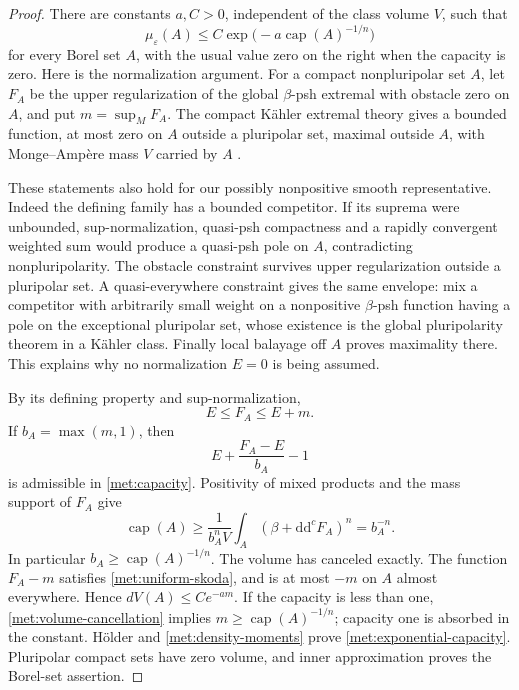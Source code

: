 \documentclass[11pt,letterpaper]{article}
\theoremstyle{definition}
\theoremstyle{remark}
\begin{document}
\begin{proof}
There are constants \(a,C>0\), independent of the class volume \(V\),
such that
\begin{equation}
 \label{met:exponential-capacity}
 \mu_\varepsilon(A)
 \leq C\exp\bigl(-a\operatorname{cap}(A)^{-1/n}\bigr)
\end{equation}
for every Borel set \(A\), with the usual value zero on the right when
the capacity is zero.  Here is the normalization argument.  For a
compact nonpluripolar set \(A\), let \(F_A\) be the upper regularization
of the global \(\beta\)-psh extremal with obstacle zero on \(A\), and
put \(m=\sup_M F_A\).  The compact K\"ahler extremal theory gives a
bounded function, at most zero on \(A\) outside a pluripolar set,
maximal outside \(A\), with Monge--Amp\`ere mass \(V\) carried by \(A\)
\cite[Sections 5--7]{GuedjZeriahiCapacity}.

These statements also hold for our possibly nonpositive smooth
representative.  Indeed the defining family has a bounded competitor.
If its suprema were unbounded, sup-normalization, quasi-psh compactness
and a rapidly convergent weighted sum would produce a quasi-psh pole
on \(A\), contradicting nonpluripolarity.  The obstacle constraint
survives upper regularization outside a pluripolar set.  A
quasi-everywhere constraint gives the same envelope: mix a competitor
with arbitrarily small weight on a nonpositive \(\beta\)-psh function
having a pole on the exceptional pluripolar set, whose existence is
the global pluripolarity theorem in a K\"ahler class.  Finally local
balayage off \(A\) proves maximality there.  This explains why no
normalization \(E=0\) is being assumed.

By its defining property and sup-normalization,
\[
 E\leq F_A\leq E+m.
\]
If \(b_A=\max(m,1)\), then
\[
 E+\frac{F_A-E}{b_A}-1
\]
is admissible in \eqref{met:capacity}.  Positivity of mixed products
and the mass support of \(F_A\) give
\begin{equation}
 \label{met:volume-cancellation}
 \operatorname{cap}(A)
 \geq\frac{1}{b_A^nV}\int_A(\beta+\mathrm{d}\mathrm{d}^{c} F_A)^n
 =b_A^{-n}.
\end{equation}
In particular \(b_A\geq\operatorname{cap}(A)^{-1/n}\).  The volume
has canceled exactly.  The function \(F_A-m\) satisfies
\eqref{met:uniform-skoda}, and is at most \(-m\) on \(A\) almost
everywhere.  Hence \(dV(A)\leq C e^{-a m}\).  If the capacity is less
than one, \eqref{met:volume-cancellation} implies
\(m\geq\operatorname{cap}(A)^{-1/n}\); capacity one is absorbed in the
constant.  H\"older and \eqref{met:density-moments} prove
\eqref{met:exponential-capacity}.  Pluripolar compact sets have zero
volume, and inner approximation proves the Borel-set assertion.


\end{proof}
\end{document}
